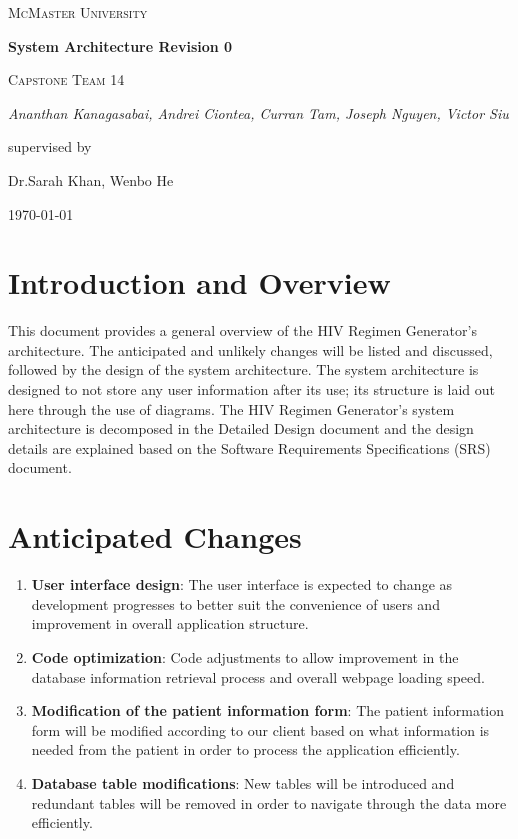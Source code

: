 \documentclass[12pt]{article}
\begin{document}
\begin{titlepage}
	\centering
	{\scshape\LARGE McMaster University \par}
	\vspace{1.5cm}
	{\huge\bfseries System Architecture Revision 0 \par}

	\vspace{1cm}
	{\scshape\Large Capstone Team 14\par}
	{\Large\itshape Ananthan Kanagasabai, Andrei Ciontea, Curran Tam, Joseph Nguyen, Victor Siu \par}
	\vspace{3cm}
	\vfill
	supervised by\par
	Dr.Sarah Khan, Wenbo He

	\vfill
	{\large \today\par}
\end{titlepage}

\newpage

\tableofcontents
\listoffigures
\newpage


\section{Introduction and Overview}
This document provides a general overview of the HIV Regimen Generator’s architecture. The anticipated and unlikely changes will be listed and discussed, followed by the design of the system architecture. The system architecture is designed to not store any user information after its use; its structure is laid out here through the use of diagrams. The HIV Regimen Generator’s system architecture is decomposed in the Detailed Design document and the design details are explained based on the Software Requirements Specifications (SRS) document.

\section{Anticipated Changes}
\begin{enumerate}
\item \textbf{User interface design}: The user interface is expected to change as development progresses to better suit the convenience of users and improvement in overall application structure.
\item \textbf{Code optimization}: Code adjustments to allow improvement in the database information retrieval process and overall webpage loading speed.
\item \textbf{Modification of the patient information form}: The patient information form will be modified according to our client based on what information is needed from the patient in order to process the application efficiently.
\item \textbf{Database table modifications}: New tables will be introduced and redundant tables will be removed in order to navigate through the data more efficiently.
\end{enumerate}
\end{document}
